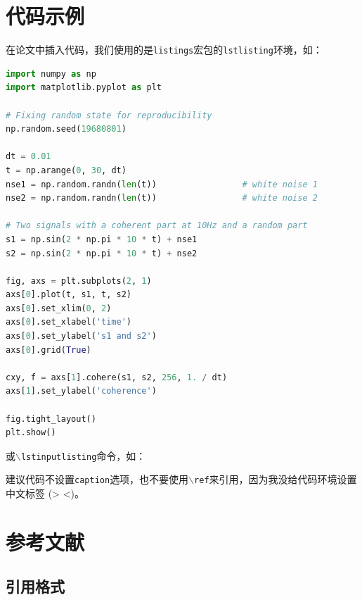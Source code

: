 \section{代码示例}

在论文中插入代码，我们使用的是\texttt{listings}宏包的\texttt{lstlisting}环境，如：
\begin{lstlisting}[language=python]
import numpy as np
import matplotlib.pyplot as plt

# Fixing random state for reproducibility
np.random.seed(19680801)

dt = 0.01
t = np.arange(0, 30, dt)
nse1 = np.random.randn(len(t))                 # white noise 1
nse2 = np.random.randn(len(t))                 # white noise 2
    
# Two signals with a coherent part at 10Hz and a random part
s1 = np.sin(2 * np.pi * 10 * t) + nse1
s2 = np.sin(2 * np.pi * 10 * t) + nse2

fig, axs = plt.subplots(2, 1)
axs[0].plot(t, s1, t, s2)
axs[0].set_xlim(0, 2)
axs[0].set_xlabel('time')
axs[0].set_ylabel('s1 and s2')
axs[0].grid(True)
 
cxy, f = axs[1].cohere(s1, s2, 256, 1. / dt)
axs[1].set_ylabel('coherence')

fig.tight_layout()
plt.show()
\end{lstlisting}
或\texttt{$\backslash$lstinputlisting}命令，如：

建议代码不设置\texttt{caption}选项，也不要使用\texttt{$\backslash$ref}来引用，因为我没给代码环境设置中文标签 (> <)。

\section{参考文献}\label{sec:bibstyle}

\subsection{引用格式}

